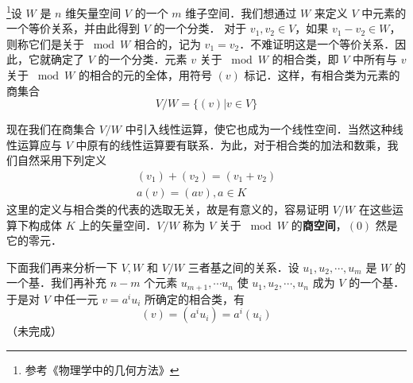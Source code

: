 

\footnote{参考《物理学中的几何方法》}设 $W$ 是 $n$ 维矢量空间 $V$ 的一个 $m$ 维子空间．我们想通过 $W$ 来定义 $V$ 中元素的一个等价关系，并由此得到 $V$ 的一个分类．
对于 $v_1,v_2\in V$，如果 $v_1-v_2\in W$，则称它们是关于 $\bmod W $ 相合的，记为 $v_1=v_2$．不难证明这是一个等价关系．因此，它就确定了 $V $ 的一个分类．元素 $v $ 关于 $\bmod W $ 的相合类，即 $V $ 中所有与 $v $ 关于 $\bmod W $ 的相合的元的全体，用符号 $(v) $ 标记．这样，有相合类为元素的商集合
\begin{equation}
V / W=\{(v) | v \in V\}
\end{equation}

现在我们在商集合 $V/W $ 中引入线性运算，使它也成为一个线性空间．当然这种线性运算应与 $V $ 中原有的线性运算要有联系．为此，对于相合类的加法和数乘，我们自然采用下列定义
\begin{equation}
\begin{array}{l}\left(v_{1}\right)+\left(v_{2}\right)=\left(v_{1}+v_{2}\right) \\ a(v)=(a v), a \in K\end{array}
\end{equation}
这里的定义与相合类的代表的选取无关，故是有意义的，容易证明 $V/W $ 在这些运算下构成体 $K $ 上的矢量空间．$V/W $ 称为 $V $ 关于 $\bmod W$ 的\textbf{商空间}，$(0)$ 然是它的零元．

下面我们再来分析一下 $V,W$ 和 $V/W $ 三者基之间的关系．设 $u_1,u_2,\cdots,u_m$ 是 $W $ 的一个基．我们再补充 $n- m$ 个元素 ${u}_{m+1}, \cdots {u}_{n}$ 使 $u_{1}, u_{2}, \cdots, u_{n}$ 成为 $V$ 的一个基．于是对 $V $ 中任一元 $v=a^iu_i$ 所确定的相合类，有
\begin{equation}
(v)=\left(a^{i} u_{i}\right)=a^{i}\left(u_{i}\right)
\end{equation}
（未完成）
